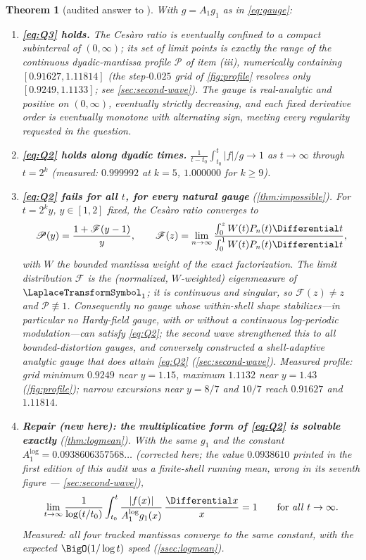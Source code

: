 \documentclass[11pt,oneside]{article}
\newtheorem{theorem}{Theorem}[section]
\theoremstyle{definition}
\theoremstyle{remark}
\begin{document}
\begin{theorem}[audited answer to \cite{mse-decay}]
\label{thm:audit-answer}
With $g=A_1g_1$ as in \eqref{eq:gauge}:
\begin{enumerate}
\item \textbf{\eqref{eq:Q3} holds.}  The Ces\`aro ratio is eventually
confined to a compact subinterval of $(0,\infty)$; its set of limit points
is exactly the range of the continuous dyadic-mantissa profile
$\mathscr P$ of item (iii), numerically containing
$[0.91627,1.11814]$ (the step-$0.025$ grid of \cref{fig:profile}
resolves only $[0.9249,1.1133]$; see \cref{sec:second-wave}).
The gauge is real-analytic and positive on $(0,\infty)$, eventually
strictly decreasing, and each fixed derivative order is eventually
monotone with alternating sign, meeting every regularity requested in the
question.
\item \textbf{\eqref{eq:Q2} holds along dyadic times.}
$\frac{1}{t-t_0}\int_{t_0}^{t}|f|/g\to1$ as $t\to\infty$ through
$t=2^k$ (measured: $0.999992$ at $k=5$, $1.000000$ for $k\ge9$).
\item \textbf{\eqref{eq:Q2} fails for all $t$, for every natural gauge}
(\cref{thm:impossible}).  For $t=2^ky$, $y\in[1,2]$ fixed, the Ces\`aro
ratio converges to
\[
 \mathscr P(y)=\frac{1+\mathscr F(y-1)}{y},
 \qquad
 \mathscr F(z)
 =\lim_{n\to\infty}
 \frac{\int_0^zW(t)P_n(t)\Differential t}{\int_0^1W(t)P_n(t)\Differential t},
\]
with $W$ the bounded mantissa weight of the exact factorization.
The limit distribution $\mathscr F$ is the (normalized, $W$-weighted)
eigenmeasure of $\LaplaceTransformSymbol_1$; it is continuous and \emph{singular}, so
$\mathscr F(z)\ne z$ and $\mathscr P\not\equiv1$.  Consequently no gauge
whose within-shell shape stabilizes---in particular no Hardy-field
gauge, with or without a continuous log-periodic
modulation---can satisfy \eqref{eq:Q2}; the second wave strengthened
this to all bounded-distortion gauges, and conversely constructed a
shell-adaptive analytic gauge that does attain \eqref{eq:Q2}
(\cref{sec:second-wave}).  Measured profile:
grid minimum $0.9249$ near $y=1.15$, maximum $1.1132$ near $y=1.43$
(\cref{fig:profile}); narrow excursions near $y=8/7$ and $10/7$ reach
$0.91627$ and $1.11814$.
\item \textbf{Repair (new here): the multiplicative form of \eqref{eq:Q2}
is solvable exactly} (\cref{thm:logmean}).  With the same $g_1$ and the
constant $A_1^{\log}=0.0938606357568\ldots$ (corrected here; the value
$0.0938610$ printed in the first edition of this audit was a
finite-shell running mean, wrong in its seventh figure ---
\cref{sec:second-wave}),
\[
 \lim_{t\to\infty}\frac{1}{\log(t/t_0)}
 \int_{t_0}^{t}\frac{|f(x)|}{A_1^{\log}g_1(x)}\,\frac{\Differential x}{x}=1
 \qquad\text{for \emph{all} } t\to\infty.
\]
Measured: all four tracked mantissas converge to the same constant, with
the expected $\BigO(1/\log t)$ speed (\cref{ssec:logmean}).
\end{enumerate}
\end{theorem}
\end{document}
